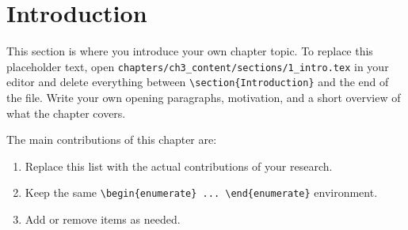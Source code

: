 \section{Introduction}\label{ch3sec:adding-intro}

This section is where you introduce your own chapter topic. To replace this placeholder text, open \texttt{chapters/ch3\_content/sections/1\_intro.tex} in your editor and delete everything between \verb|\section{Introduction}| and the end of the file. Write your own opening paragraphs, motivation, and a short overview of what the chapter covers.

\begin{figure}[t]
\centering
{}
\label{ch3fig:intro}
\end{figure}

The main contributions of this chapter are:

\begin{enumerate}
\item Replace this list with the actual contributions of your research.
\item Keep the same \verb|\begin{enumerate} ... \end{enumerate}| environment.
\item Add or remove items as needed.
\end{enumerate}
